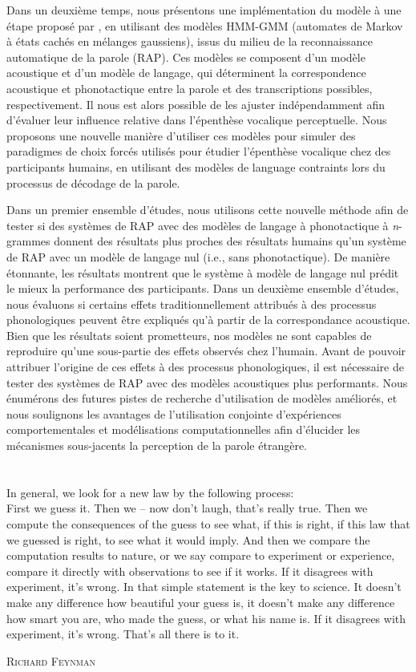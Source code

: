 \documentclass[12pt, twoside]{report}
\begin{document}
Dans un deuxième temps, nous présentons une implémentation du modèle à une étape proposé par \cite{wilson2013}, en utilisant des modèles HMM-GMM (automates de Markov à états cachés en mélanges gaussiens), issus du milieu de la reconnaissance automatique de la parole (RAP). Ces modèles se composent d'un modèle acoustique et d'un modèle de langage, qui déterminent la correspondence acoustique et phonotactique entre la parole et des transcriptions possibles, respectivement. Il nous est alors possible de les ajuster indépendamment afin d'évaluer leur influence relative dans l'épenthèse vocalique perceptuelle. Nous proposons une nouvelle manière d'utiliser ces modèles pour simuler des paradigmes de choix forcés utilisés pour étudier l'épenthèse vocalique chez des participants humains, en utilisant des modèles de language contraints lors du processus de décodage de la parole.

Dans un premier ensemble d'études, nous utilisons cette nouvelle méthode afin de tester si des systèmes de RAP avec des modèles de langage à phonotactique à \textit{n}-grammes donnent des résultats plus proches des résultats humains qu'un système de RAP avec un modèle de langage nul (i.e., sans phonotactique). De manière étonnante, les résultats montrent que le système à modèle de langage nul prédit le mieux la performance des participants.
Dans un deuxième ensemble d'études, nous évaluons si certains effets traditionnellement attribués à des processus phonologiques peuvent être expliqués qu'à partir de la correspondance acoustique. Bien que les résultats soient prometteurs, nos modèles ne sont capables de reproduire qu'une sous-partie des effets observés chez l'humain. Avant de pouvoir attribuer l'origine de ces effets à des processus phonologiques, il est nécessaire de tester des systèmes de RAP avec des modèles acoustiques plus performants. Nous énumérons des futures pistes de recherche d'utilisation de modèles améliorés, et nous soulignons les avantages de l'utilisation conjointe d'expériences comportementales et modélisations computationnelles afin d'élucider les mécanismes sous-jacents la perception de la parole étrangère.  

\chapter*{}
\setlength{\epigraphwidth}{0.9\textwidth}

\epigraph{In general, we look for a new law by the following process: \\ First we guess it. Then we – now don't laugh, that's really true. Then we compute the consequences of the guess to see what, if this is right, if this law that we guessed is right, to see what it would imply. And then we compare the computation results to nature, or we say compare to experiment or experience, compare it directly with observations to see if it works. If it disagrees with experiment, it's wrong. In that simple statement is the key to science. It doesn't make any difference how beautiful your guess is, it doesn't make any difference how smart you are, who made the guess, or what his name is. If it disagrees with experiment, it's wrong. That's all there is to it.}{\textsc{Richard Feynman}}
\end{document}
